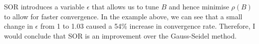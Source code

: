 \documentclass[../main.tex]{subfiles}
\begin{document}
    SOR introduces a variable $\epsilon$ that allows us to tune $B$ and hence minimise $\rho(B)$ to
    allow for faster convergence.
    In the example above, we can see that a small change in $\epsilon$ from 1 to 1.03
    caused a 54\% increase in convergence rate.
    Therefore, I would conclude that SOR is an improvement over the Gauss-Seidel method.
\end{document}
